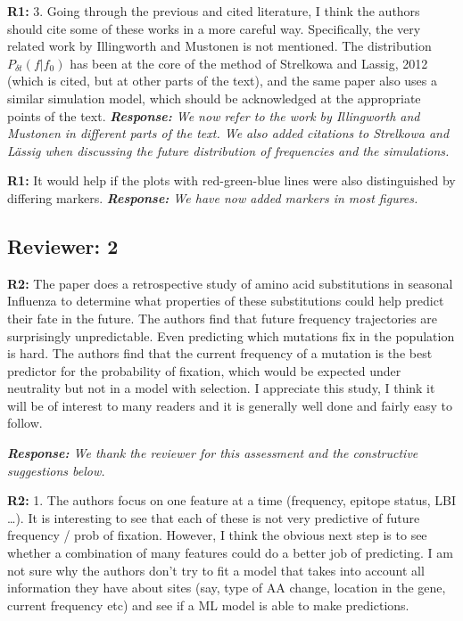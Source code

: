 \documentclass[aps,rmp,onecolumn]{revtex4-1}
\newcommand{\refa}[1]{\textbf{R1:} #1\vskip 5mm}
\newcommand{\refb}[1]{\textbf{R2:} #1\vskip 5mm}
\newcommand{\response}[1]{{\it {\color{response}\textbf{Response:} #1}}\vskip 5mm}
\begin{document}
\refa{3. Going through the previous and cited literature, I think the authors should cite some of these works in a more careful way. Specifically, the very related work by Illingworth and Mustonen is not mentioned. The distribution $P_{\delta t}(f|f_0)$ has been at the core of
the method of Strelkowa and Lassig, 2012 (which is cited, but at other
parts of the text), and the same paper also uses a similar simulation model, which should be acknowledged at the appropriate points of the text.}
\response{We now refer to the work by Illingworth and Mustonen in different parts of the text. We also added citations to Strelkowa and L\"assig when discussing the future distribution of frequencies and the simulations.}

\refa{It would help if the plots with red-green-blue lines were also distinguished by differing markers.}
\response{We have now added markers in most figures.}


\subsection*{Reviewer: 2}

\refb{The paper does a retrospective study of amino acid substitutions in seasonal Influenza to determine what properties of these substitutions could help predict their fate in the future. The authors find that future frequency trajectories are surprisingly unpredictable. Even predicting which mutations fix in the population is hard. The authors find that the current frequency of a mutation is the best predictor for the probability of fixation, which would be expected under neutrality but not in a model with selection.
I appreciate this study, I think it will be of interest to many readers and it is generally well done and fairly easy to follow.
}

\response{We thank the reviewer for this assessment and the constructive suggestions below. }

\refb{1. The authors focus on one feature at a time (frequency, epitope status, LBI …). It is interesting to see that each of these is not very predictive of future frequency / prob of fixation. However, I think the obvious next step is to see whether a combination of many features could do a better job of predicting. I am not sure why the authors don’t try to fit a model that takes into account all information they have about sites (say, type of AA change, location in the gene, current frequency etc) and see if a ML model is able to make predictions. }
\end{document}
